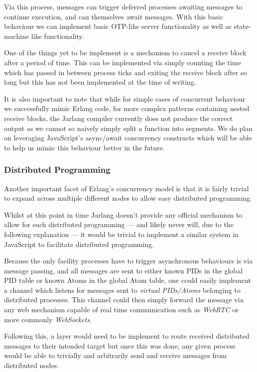 \documentclass[twoside,12pt,titlepage,a4paper]{article}
\begin{document}
Via this process, messages can trigger deferred processes awaiting messages to continue execution, and can themselves await messages. With this basic behaviour we can implement basic OTP-like server functionality as well as state-machine like functionality.

One of the things yet to be implement is a mechanism to cancel a receive block after a period of time. This can be implemented via simply counting the time which has passed in between process ticks and exiting the receive block after so long but this has not been implemented at the time of writing.

It is also important to note that while for simple cases of concurrent behaviour we successfully mimic Erlang code, for more complex patterns containing nested receive blocks, the Jarlang compiler currently does not produce the correct output as we cannot so naively simply split a function into segments. We do plan on leveraging JavaScript's async/await concurrency constructs which will be able to help us mimic this behaviour better in the future.

\subsubsection{Distributed Programming}

Another important facet of Erlang's concurrency model is that it is fairly trivial to expand across multiple different nodes to allow easy distributed programming.

Whilst at this point in time Jarlang doesn't provide any official mechanism to allow for such distributed programming --- and likely never will, due to the following explanation --- it would be trivial to implement a similar system in JavaScript to facilitate distributed programming. 

Because the only facility processes have to trigger asynchronous behaviours is via message passing, and all messages are sent to either known PIDs in the global PID table or known Atoms in the global Atom table, one could easily implement a channel which listens for messages sent to \textit{virtual PIDs/Atoms} belonging to distributed processes. This channel could then simply forward the message via any web mechanism capable of real time communication such as \textit{WebRTC} or more commonly \textit{WebSockets}. 

Following this, a layer would need to be implement to route received distributed messages to their intended target but once this was done, any given process would be able to trivially and arbitrarily send and receive messages from distributed nodes.
\end{document}
